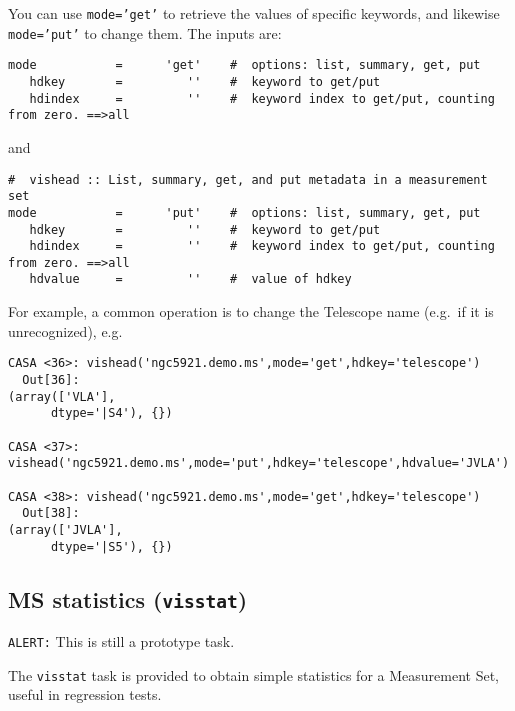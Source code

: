You can use {\tt mode='get'} to retrieve the values of specific
keywords, and likewise {\tt mode='put'} to change them.
The inputs are:
\small
\begin{verbatim}
mode           =      'get'    #  options: list, summary, get, put
   hdkey       =         ''    #  keyword to get/put
   hdindex     =         ''    #  keyword index to get/put, counting from zero. ==>all
\end{verbatim}
\normalsize
and
\small
\begin{verbatim}
#  vishead :: List, summary, get, and put metadata in a measurement set
mode           =      'put'    #  options: list, summary, get, put
   hdkey       =         ''    #  keyword to get/put
   hdindex     =         ''    #  keyword index to get/put, counting from zero. ==>all
   hdvalue     =         ''    #  value of hdkey
\end{verbatim}
\normalsize
For example, a common operation is to change the Telescope name (e.g.\
if it is unrecognized), e.g.
\small
\begin{verbatim}
CASA <36>: vishead('ngc5921.demo.ms',mode='get',hdkey='telescope')
  Out[36]: 
(array(['VLA'], 
      dtype='|S4'), {})

CASA <37>: vishead('ngc5921.demo.ms',mode='put',hdkey='telescope',hdvalue='JVLA')

CASA <38>: vishead('ngc5921.demo.ms',mode='get',hdkey='telescope')
  Out[38]: 
(array(['JVLA'], 
      dtype='|S5'), {})
\end{verbatim}
\normalsize


\subsection{MS statistics ({\tt visstat})}
\label{section:io.vis.visstat}

{\tt ALERT:} This is still a prototype task.

The {\tt visstat} task is provided to obtain simple statistics for a
Measurement Set, useful in regression tests.

